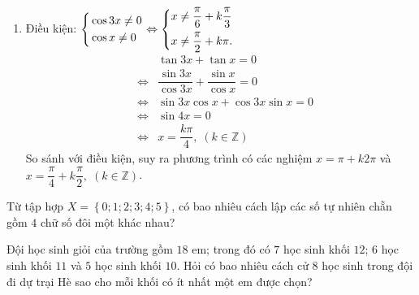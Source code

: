 \begin{bt}
{\begin{enumerate}
\item Điều kiện: $\left\{\begin{aligned}& \cos 3x \ne 0\\ & \cos x \ne 0\end{aligned}\right. \Leftrightarrow \left\{\begin{aligned}&x \ne \dfrac{\pi}{6}+k \dfrac{\pi}{3}\\ & x \ne \dfrac{\pi}{2}+k \pi.\end{aligned}\right.$
\begin{eqnarray*}
&& \tan 3x + \tan x =0\\
& \Leftrightarrow & \dfrac{\sin 3x}{\cos 3x}+ \dfrac{\sin x }{\cos x }=0 \\
& \Leftrightarrow & \sin 3x \cos x + \cos 3x \sin x = 0\\
& \Leftrightarrow & \sin 4x =0\\
& \Leftrightarrow & x = \dfrac{k\pi}{4},\; ( k\in \mathbb{Z})
\end{eqnarray*}
So sánh với điều kiện, suy ra phương trình có các nghiệm $x=\pi + k 2 \pi$ và $x = \dfrac{\pi}{4}+k \dfrac{\pi}{2}, \; (k \in \mathbb{Z})$.
		\end{enumerate}	
	}
\end{bt}

\begin{bt}%
	Từ tập hợp $ X=\left\{ 0;1;2;3;4;5\right\} $, có bao nhiêu cách lập các số tự nhiên chẵn gồm $ 4 $ chữ số đôi một khác nhau?
\end{bt}


\begin{bt}%
	Đội học sinh giỏi của trường gồm $18$	em; trong đó có $7$ học sinh khối $ 12 $; $ 6 $ học sinh khối $ 11 $ và $ 5 $ học sinh khối $ 10 $. Hỏi có bao nhiêu cách cử $ 8 $ học sinh trong đội đi dự trại Hè sao cho mỗi khối có ít nhất một em được chọn?
\end{bt}

